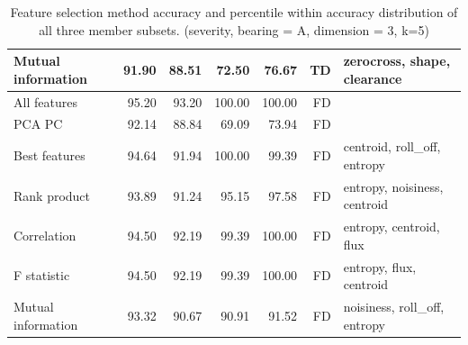 \begin{table}[h]
\begin{adjustbox}{width=\textwidth}
\begin{tabular}{|l|rr|rr|r|l|}
Mutual information                    & \multicolumn{1}{r|}{91.90}          & 88.51                              & \multicolumn{1}{r|}{72.50}          & 76.67                              & TD                                                   & zerocross, shape, clearance             \\ \hline
All features                          & \multicolumn{1}{r|}{95.20}          & 93.20                              & \multicolumn{1}{r|}{100.00}         & 100.00                             & FD                                                   &                                         \\ \hline
PCA PC                                & \multicolumn{1}{r|}{92.14}          & 88.84                              & \multicolumn{1}{r|}{69.09}          & 73.94                              & FD                                                   &                                         \\ \hline
Best features                         & \multicolumn{1}{r|}{94.64}          & 91.94                              & \multicolumn{1}{r|}{100.00}         & 99.39                              & FD                                                   & centroid, roll\_off, entropy            \\ \hline
Rank product                          & \multicolumn{1}{r|}{93.89}          & 91.24                              & \multicolumn{1}{r|}{95.15}          & 97.58                              & FD                                                   & entropy, noisiness, centroid            \\ \hline
Correlation                           & \multicolumn{1}{r|}{94.50}          & 92.19                              & \multicolumn{1}{r|}{99.39}          & 100.00                             & FD                                                   & entropy, centroid, flux                 \\ \hline
F statistic                           & \multicolumn{1}{r|}{94.50}          & 92.19                              & \multicolumn{1}{r|}{99.39}          & 100.00                             & FD                                                   & entropy, flux, centroid                 \\ \hline
Mutual information                    & \multicolumn{1}{r|}{93.32}          & 90.67                              & \multicolumn{1}{r|}{90.91}          & 91.52                              & FD                                                   & noisiness, roll\_off, entropy           \\ \hline
\end{tabular}
\end{adjustbox}
\caption{Feature selection method accuracy and percentile within accuracy distribution of all three member subsets. (severity, bearing = A, dimension = 3, k=5)}
\label{tab:evaluation:fsel-severity}
\end{table}

